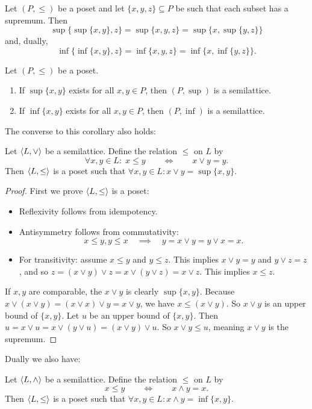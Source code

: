 \begin{proposition}
Let $(P,\leq)$ be a poset and let $\{x,y,z\}\subseteq P$ be such that each subset has a supremum. Then
\[ \sup\{\sup\{x,y\},z\} = \sup\{x,y,z\} = \sup\{x,\sup\{y,z\}\} \]
and, dually,
\[ \inf\{\inf\{x,y\},z\} = \inf\{x,y,z\} = \inf\{x,\inf\{y,z\}\}. \]
\end{proposition}
\begin{corollary}
Let $(P,\leq)$ be a poset.
\begin{enumerate}
\item If $\sup\{x,y\}$ exists for all $x,y\in P$, then $(P,\sup)$ is a semilattice.
\item If $\inf\{x,y\}$ exists for all $x,y\in P$, then $(P,\inf)$ is a semilattice.
\end{enumerate}
\end{corollary}
The converse to this corollary also holds:
\begin{proposition} \label{prop:orderSemilattice}
Let $\langle L,\vee \rangle$ be a semilattice. Define the relation $\leq$ on $L$ by
\[ \forall x,y\in L:\; x\leq y \qquad \iff \qquad x\vee y = y. \]
Then $\langle L,\leq \rangle$ is a poset such that $\forall x,y\in L: x\vee y = \sup\{x,y\}$.
\end{proposition}
\begin{proof}
First we prove $\langle L,\leq \rangle$ is a poset:
\begin{itemize}
\item Reflexivity follows from idempotency.
\item Antisymmetry follows from commutativity:
\[ x\leq y, y\leq x \quad\implies\quad y = x\vee y = y \vee x = x. \]
\item For transitivity: assume $x\leq y$ and $y\leq z$. This implies $x\vee y = y$ and $y\vee z = z$, and so $z = (x\vee y)\vee z =x\vee (y\vee z) =x\vee z$. This implies $x\leq z$.
\end{itemize}
If $x,y$ are comparable, the $x \vee y$ is clearly $\sup\{x,y\}$. Because $x\vee(x\vee y) = (x\vee x)\vee y = x\vee y$, we have $x\leq (x\vee y)$. So $x\vee y$ is an upper bound of $\{x,y\}$. Let $u$ be an upper bound of $\{x,y\}$. Then $u = x\vee u = x\vee (y\vee u) = (x\vee y)\vee u$. So $x\vee y \leq u$, meaning $x\vee y$ is the supremum.
\end{proof}
Dually we also have:
\begin{corollary}
Let $\langle L,\wedge \rangle$ be a semilattice. Define the relation $\leq$ on $L$ by
\[ x\leq y \qquad \iff \qquad x\wedge y = x. \]
Then $\langle L,\leq \rangle$ is a poset such that $\forall x,y\in L: x\wedge y = \inf\{x,y\}$.
\end{corollary}

